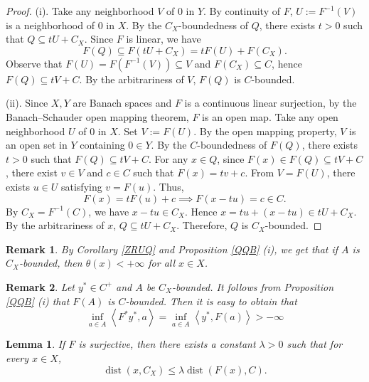 \documentclass[10pt,a4paper]{amsart}
\newtheorem{lemma}{Lemma}[section]
\newtheorem{remark}{Remark}[section]
\begin{document}
\begin{proof}
	(i). Take any neighborhood $V$ of $0$ in $Y$. By continuity of $F$, $U := F^{-1}(V)$ is a neighborhood of $0$ in $X$. By the $C_X$-boundedness of $Q$, there exists $t > 0$ such that $Q \subseteq tU + C_X$. Since $F$ is linear,  we have 
	\[
	F(Q) \subseteq F(tU + C_X) = tF(U) + F(C_X).
	\]
	Observe that $F(U) = F(F^{-1}(V)) \subseteq V$ and $F(C_X) \subseteq C$, hence $F(Q) \subseteq tV + C$.
	By the arbitrariness of $V$, $F(Q)$ is $C$-bounded.
	
	(ii). Since $X, Y$ are Banach spaces and $F$ is a continuous linear surjection, by the Banach--Schauder open mapping theorem, $F$ is an open map. Take any open neighborhood $U$ of $0$ in $X$. Set $V := F(U)$. By the open mapping property, $V$ is an open set in $Y$ containing $0 \in Y$. By the $C$-boundedness of $F(Q)$, there exists $t > 0$ such that $F(Q) \subseteq tV + C$. For any $x \in Q$, since $F(x) \in F(Q) \subseteq tV + C$, there exist $v \in V$ and $c \in C$ such that $F(x) = t v + c$. From $V = F(U)$, there exists $u \in U$ satisfying $v = F(u)$. Thus,
	\[
	F(x) = t F(u) + c \implies F(x - t u) = c \in C.
	\]
	By $C_X = F^{-1}(C)$, we have $x - t u \in C_X$. Hence $x = t u + (x - t u) \in tU + C_X$.
	By the arbitrariness of $x$, $Q \subseteq tU + C_X$. Therefore, $Q$ is $C_X$-bounded.
\end{proof}


\begin{remark}  By   Corollary  \ref{ZRUQ}  and Proposition  \ref{QQB}  (i), we get that  if $A$ is $C_X$-bounded, then $\theta(x)<+\infty$ for all $x\in X$.
   \end{remark}


\begin{remark}   \label{VKYJQ}  Let $y^* \in  C^+$ and  $A$ be $C_X$-bounded.  It follows from  Proposition  \ref{QQB}  (i)  that $F(A)$ is $C$-bounded. Then it is easy to obtain that 
	$$\mathop {\inf }\limits_{a \in A} \left\langle {{F^*}{y^*},a} \right\rangle  = \mathop {\inf }\limits_{a \in A} \left\langle {{y^*},F\left( a \right)} \right\rangle  >  - \infty $$
	
  \end{remark}


\begin{lemma}\label{XDRT}
	If $F$ is surjective, then there exists a constant $\lambda>0$ such that for every $x\in X$,
	\[
	\operatorname{dist}(x, C_X) \le \lambda \operatorname{dist}(F(x), C).
	\]
\end{lemma}
\end{document}
